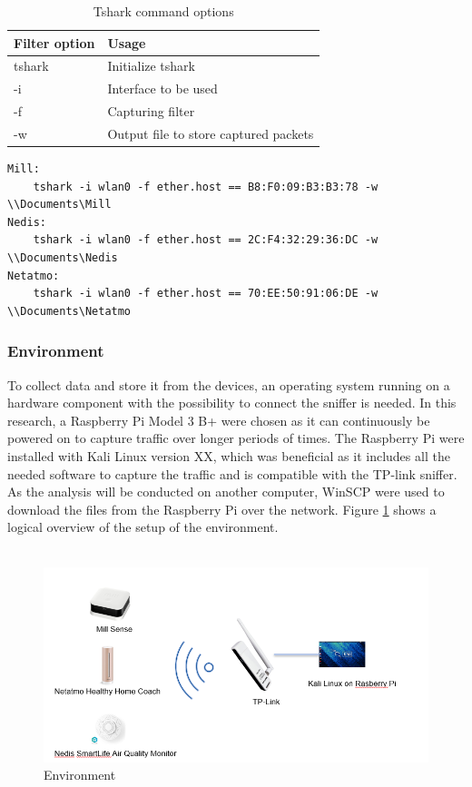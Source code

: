 \begin{table}[H]
    \centering
    \caption{Tshark command options}
    \begin{tabular}{|l|l|}
    \hline
    \textbf{Filter option} & \textbf{Usage}                        \\ \hline
    tshark                 & Initialize tshark                     \\ \hline
    -i                     & Interface to be used                  \\ \hline
    -f                     & Capturing filter                      \\ \hline
    -w                     & Output file to store captured packets \\ \hline
    \end{tabular}
    \label{tab:tshark}
\end{table}

\begin{verbatim}
Mill:
    tshark -i wlan0 -f ether.host == B8:F0:09:B3:B3:78 -w \\Documents\Mill
Nedis:
    tshark -i wlan0 -f ether.host == 2C:F4:32:29:36:DC -w \\Documents\Nedis
Netatmo:
    tshark -i wlan0 -f ether.host == 70:EE:50:91:06:DE -w \\Documents\Netatmo
\end{verbatim}

\subsubsection{Environment}
To collect data and store it from the devices, an operating system running on a hardware component with the possibility to connect the sniffer is needed. In this research, a Raspberry Pi Model 3 B+ were chosen as it can continuously be powered on to capture traffic over longer periods of times. The Raspberry Pi were installed with Kali Linux version XX, which was beneficial as it includes all the needed software to capture the traffic and is compatible with the TP-link sniffer. As the analysis will be conducted on another computer, WinSCP were used to download the files from the Raspberry Pi over the network. Figure \ref{fig:Environment} shows a logical overview of the setup of the environment.  
\\\\
\begin{figure} [!ht]
    \centering
    \includegraphics[width=1\textwidth]{figures/Environment.png}
    \caption{Environment}
    \label{fig:Environment}
\end{figure}

